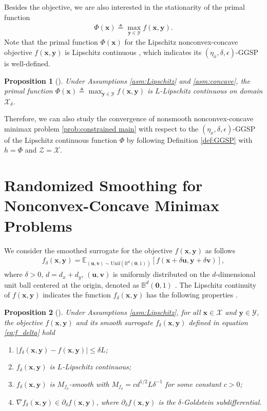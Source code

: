 \documentclass[11pt]{article}
\def\vzero{\mathbf{0}}
\def\vu{\mathbf{u}}
\def\vv{\mathbf{v}}
\def\vx{\mathbf{x}}
\def\vy{\mathbf{y}}
\def\fX{{\mathcal{X}}}
\def\fY{{\mathcal{Y}}}
\def\fZ{{\mathcal{Z}}}
\def\BE{{\mathbb{E}}}
\def\BB{{\mathbb{B}}}
\newtheorem{proposition}{Proposition}
\begin{document}
Besides the objective, we are also interested in the stationarity of the primal function
\begin{align*}
\Phi(\vx) \triangleq \max_{\vy \in \mathcal{Y}} f(\vx, \vy).
\end{align*}
Note that the primal function $\Phi(\vx)$ for the Lipschitz nonconvex-concave objective $f(\vx,\vy)$ is Lipschitz continuous \citep{lin2025two}, which indicates its $(\eta_x,\delta,\epsilon)$-GGSP is well-defined. 
\begin{proposition}[{\citet[Lemma 4.2]{lin2025two}}]\label{Lipshitz of Phi}
    Under Assumptions \ref{asm:Lipschitz} and \ref{asm:concave}, the primal function $\Phi(\vx) \triangleq \max_{\vy \in \mathcal{Y}} f(\vx, \vy)$ is $L$-Lipschitz continuous on domain $\fX_\delta$.
\end{proposition}
Therefore, we can also study the convergence of nonsmooth nonconvex-concave minimax problem \eqref{prob:constrained main} with respect to the $(\eta_x,\delta,\epsilon)$-GGSP of the Lipschitz continuous function $\Phi$ by following Definition \ref{def:GGSP} with~$h=\Phi$ and $\fZ=\fX$.



\section{Randomized Smoothing for Nonconvex-Concave Minimax Problems}\label{sec:smoothing}

We consider the smoothed surrogate for the objective $f(\vx,\vy)$ as follows
\begin{align}\label{eq:f_delta}
    f_\delta(\vx,\vy) = \BE_{(\vu,\vv)\sim {\mathrm{Unif}}(\BB ^{d}(\vzero,1))} [f(\vx+\delta\vu, \vy+\delta\vv)],
\end{align}
where $\delta>0$, $d=d_x+d_y$, $(\vu,\vv)$ is uniformly distributed on the $d$-dimensional unit ball centered at the origin, denoted as $\BB^{d}(\vzero,1)$ \citep{yousefian2012stochastic}.
The Lipschitz continuity of $f(\vx,\vy)$ indicates the function $f_\delta(\vx,\vy)$ has the following properties \citep{lin2022gradient}. 


\begin{proposition}[\citet{lin2022gradient}]\label{prop:smoothing}
Under Assumptions \ref{asm:Lipschitz}, for all $\vx\in\fX$ and $\vy\in\fY$, the objective $f(\vx,\vy)$ and its smooth surrogate $f_\delta(\vx,\vy)$ defined in equation \eqref{eq:f_delta} hold
\begin{enumerate}[leftmargin=0.8cm,topsep=1.5pt,itemsep=2.5pt,partopsep=2.5pt, parsep=2.5pt]
\item[(a)] $\vert f_{\delta}(\vx,\vy) - f(\vx,\vy) \vert \le \delta L$;
\item[(b)] $f_{\delta}(\vx,\vy)$ is $L$-Lipschitz continuous;
\item[(c)] $f_{\delta}(\vx,\vy)$ is $M_{f_\delta}$-smooth with $M_{f_\delta}=cd^{1/2}L\delta^{-1}$ for some constant $c>0$; 
\item[(d)]  $\nabla f_{\delta}(\vx,\vy) \in \partial_{\delta} f(\vx,\vy)$, where $\partial_{\delta} f(\vx,\vy)$ is the $\delta$-Goldstein subdifferential.
\end{enumerate}
\end{proposition}
\end{document}
